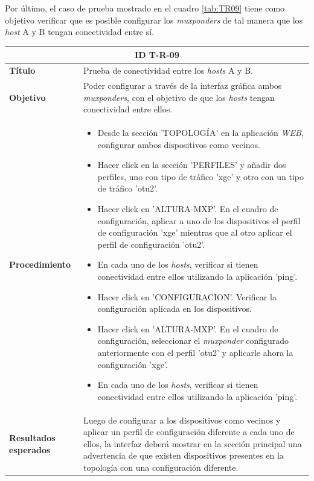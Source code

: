       Por último, el caso de prueba mostrado en el cuadro \ref{tab:TR09} tiene como objetivo verificar que es posible configurar los \textit{muxponders} de tal manera que los \textit{host} A y B tengan conectividad entre sí. 

      \begin{table}[H]
        \centering
        \begin{tabular}{ |m{2.5cm}|m{11cm}|  }
        \hline
        \multicolumn{2}{|c|}{ \textbf{ID T-R-09} } \\
        \hline
        \centering
        \textbf{Título} & Prueba de conectividad entre los \textit{hosts} A y B.  \\
        \hline
        \centering
        \textbf{Objetivo} & Poder configurar a través de la interfaz gráfica ambos \textit{muxponders}, con el objetivo de que los \textit{hosts} tengan conectividad entre ellos.   \\
        \hline
        \centering
        \textbf{Procedimiento} & \begin{itemize}
          \item Desde la sección 'TOPOLOGÍA' en la aplicación \textit{WEB}, configurar ambos dispositivos como vecinos.
          \item Hacer click en la sección 'PERFILES' y añadir dos perfiles, uno con tipo de tráfico 'xge' y otro con un tipo de tráfico 'otu2'.
          \item  Hacer click en 'ALTURA-MXP'. En el cuadro de configuración, aplicar a uno de los dispositivos el perfil de configuración 'xge' mientras que al otro aplicar el perfil de configuración 'otu2'.
          \item En cada uno de los \textit{hosts}, verificar si tienen conectividad entre ellos utilizando la aplicación 'ping'.
          \item Hacer click en 'CONFIGURACION'. Verificar la configuración aplicada en los dispositivos.
          \item Hacer click en 'ALTURA-MXP'. En el cuadro de configuración, seleccionar el \textit{muxponder} configurado anteriormente con el perfil 'otu2' y aplicarle ahora la configuración 'xge'.
          \item En cada uno de los \textit{hosts}, verificar si tienen conectividad entre ellos utilizando la aplicación 'ping'.

        \end{itemize}     \\
        \hline
        \centering
        \textbf{Resultados esperados} & 
        Luego de configurar a los dispositivos como vecinos y aplicar un perfil de configuración diferente a cada uno de ellos, la interfaz deberá mostrar en la sección principal una advertencia de que existen dispositivos presentes en la topología con una configuración diferente. 


\end{tabular}
\end{table}
